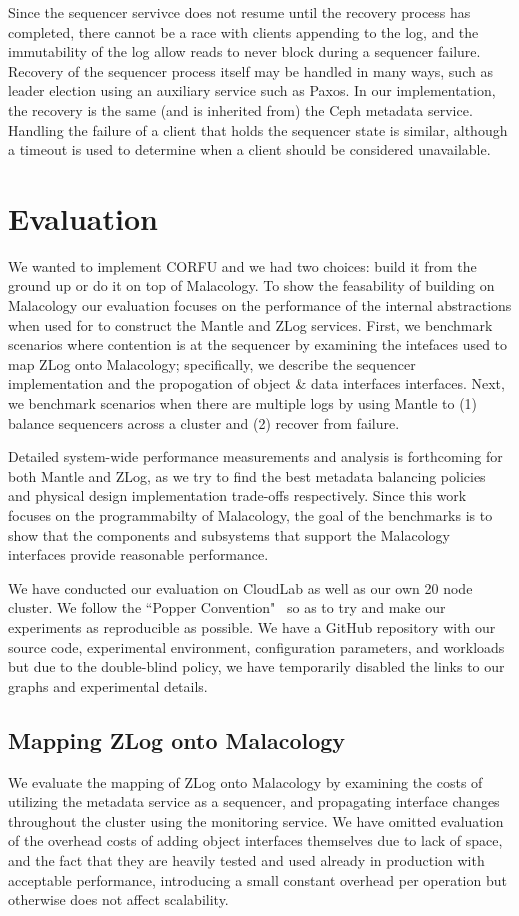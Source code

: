 \documentclass[preprint]{sigplanconf-eurosys}
\begin{document}
Since the sequencer servivce does not resume until the recovery process has
completed, there cannot be a race with clients appending to the log, and the
immutability of the log allow reads to never block during a sequencer failure.
Recovery of the sequencer process itself may be handled in many ways, such as
leader election using an auxiliary service such as Paxos. In our
implementation, the recovery is the same (and is inherited from) the Ceph
metadata service. Handling the failure of a client that holds the sequencer
state is similar, although a timeout is used to determine when a client should
be considered unavailable.

\section{Evaluation}
\label{sec:evaluation} 

We wanted to implement CORFU and we had two choices: build it from the ground
up or do it on top of Malacology. To show the feasability of building on
Malacology our evaluation focuses on the performance of the internal
abstractions when used for to construct the Mantle and ZLog services. First, we
benchmark scenarios where contention is at the sequencer by examining the
intefaces used to map ZLog onto Malacology; specifically, we describe the
sequencer implementation and the propogation of object \& data interfaces
interfaces. Next, we benchmark scenarios when there are multiple logs by using
Mantle to (1) balance sequencers across a cluster and (2) recover from failure.

Detailed system-wide performance measurements and analysis is forthcoming for
both Mantle and ZLog, as we try to find the best metadata balancing policies
and physical design implementation trade-offs respectively.  Since this work
focuses on the programmabilty of Malacology, the goal of the benchmarks is to
show that the components and subsystems that support the Malacology interfaces
provide reasonable performance.  

We have conducted our evaluation on CloudLab as well as our own 20 node
cluster. We follow the ``Popper Convention"~\cite{anonymous} so as to try and
make our experiments as reproducible as possible. We have a GitHub repository
with our source code, experimental environment, configuration parameters, and
workloads but due to the double-blind policy, we have temporarily disabled the
links to our graphs and experimental details.

\subsection{Mapping ZLog onto Malacology}
\label{sec:mapping-zlog-onto-malacology}
We evaluate the mapping of ZLog onto Malacology by examining the costs of
utilizing the metadata service as a sequencer, and propagating interface
changes throughout the cluster using the monitoring service. We have omitted
evaluation of the overhead costs of adding object interfaces themselves due to
lack of space, and the fact that they are heavily tested and used already in
production with acceptable performance, introducing a small constant overhead
per operation but otherwise does not affect scalability.
\end{document}
